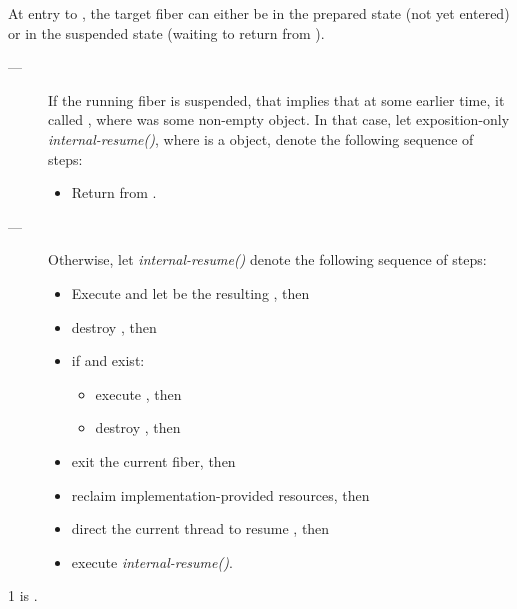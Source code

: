 At entry to \resumewith, the target fiber can either be in the prepared state
(not yet entered) or in the suspended state (waiting to return from \resumewith).

\begin{description}
    \item[---]
          If the running fiber is suspended, that implies that at some earlier
          time, it called \resumewith[other], where  was some
          non-empty \fiber object. In that case, let
          exposition-only \emph{internal-resume()},
          where  is a \fiber object, denote the following sequence
          of steps:
        \begin{itemize}
            \item Return  from \resumewith[other].
        \end{itemize}   
    \item[---] Otherwise, let \emph{internal-resume()}
          denote the following sequence of steps:
        \begin{itemize}
            \item Execute
                  and let  be the resulting \fiber, then
            \item destroy , then
            \item if  and  exist:
                \begin{itemize}
                    \item execute , then
                    \item destroy , then
                \end{itemize}
            \item exit the current fiber, then
            \item reclaim implementation-provided resources, then
            \item direct the current thread to resume , then
            \item execute \emph{internal-resume()}.
        \end{itemize}
\end{description}

1 \mandates
{} is \true.

